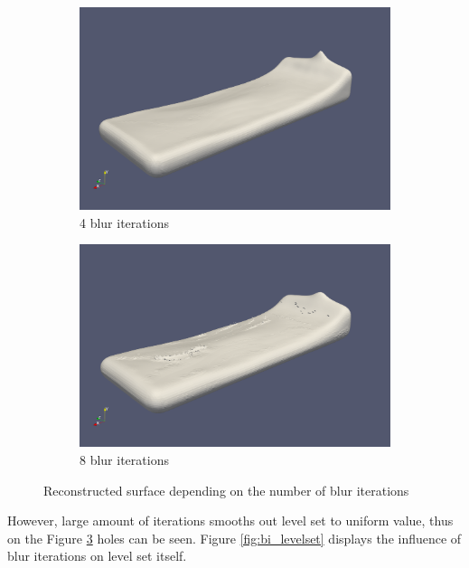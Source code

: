 \begin{figure}[H]
\begin{subfigure}[b]{0.5\textwidth}
				\label{fig:bi_1iteration}
        \end{subfigure}
        \begin{subfigure}[b]{0.5\textwidth}
               \includegraphics[width=\textwidth]{figures/ReconstructionIterations4.png}
				\caption{4 blur iterations}
               \label{fig:bi_4iteration}
        \end{subfigure}
        \begin{subfigure}[b]{0.5\textwidth}
               \includegraphics[width=\textwidth]{figures/ReconstructionIterations8.png}
				\caption{8 blur iterations}
               \label{fig:bi_8iteration}
        \end{subfigure}
       \caption{Reconstructed surface depending on the number of blur iterations}
       \label{fig:bi_reconstruction}
\end{figure}
However, large amount of iterations smooths out level set to uniform value, thus on the Figure \ref{fig:bi_8iteration} holes can be seen. Figure \ref{fig:bi_levelset} displays the influence of blur iterations on level set itself. 
